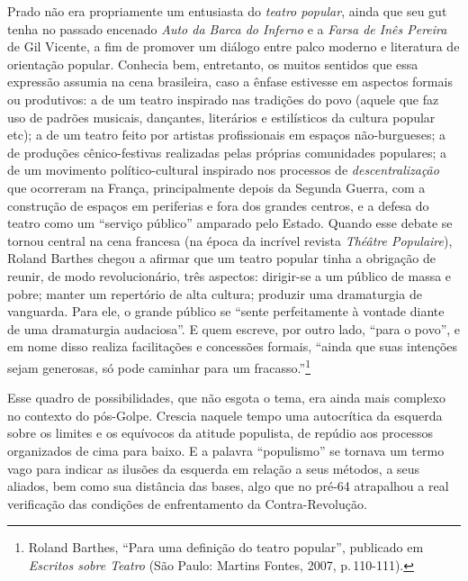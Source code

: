 Prado não era propriamente um entusiasta do {\it teatro popular}, ainda
que seu {\sc gut} tenha no passado encenado {\it Auto da Barca do Inferno} e a
{\it Farsa de Inês Pereira} de Gil Vicente, a fim de promover um diálogo
entre palco moderno e literatura de orientação popular. Conhecia bem,
entretanto, os muitos sentidos que essa expressão assumia na cena
brasileira, caso a ênfase estivesse em aspectos formais ou produtivos: a
de um teatro inspirado nas tradições do povo (aquele que faz uso de
padrões musicais, dançantes, literários e estilísticos da cultura
popular etc); a de um teatro feito por artistas profissionais em espaços
não-burgueses; a de produções cênico-festivas realizadas pelas próprias
comunidades populares; a de um movimento político-cultural inspirado nos
processos de {\it descentralização} que ocorreram na França,
principalmente depois da Segunda Guerra, com a construção de espaços em
periferias e fora dos grandes centros, e a defesa do teatro como um
“serviço público” amparado pelo Estado. Quando esse debate se tornou
central na cena francesa (na época da incrível revista {\it Théâtre
Populaire}), Roland Barthes chegou a afirmar que um teatro popular tinha
a obrigação de reunir, de modo revolucionário, três aspectos: dirigir-se
a um público de massa e pobre; manter um repertório de alta cultura;
produzir uma dramaturgia de vanguarda. Para ele, o grande público se
“sente perfeitamente à vontade diante de uma dramaturgia audaciosa”. E
quem escreve, por outro lado, “para o povo”, e em nome disso realiza
facilitações e concessões formais, “ainda que suas intenções sejam
generosas, só pode caminhar para um fracasso.”\footnote{Roland Barthes,
  “Para uma definição do teatro popular”, publicado em {\it Escritos
  sobre Teatro} (São Paulo: Martins Fontes, 2007, p.\,110-111).}

Esse quadro de possibilidades, que não esgota o tema, era ainda mais
complexo no contexto do pós-Golpe. Crescia naquele tempo uma autocrítica
da esquerda sobre os limites e os equívocos da atitude populista, de
repúdio aos processos organizados de cima para baixo. E a palavra
“populismo” se tornava um termo vago para indicar as ilusões da esquerda
em relação a seus métodos, a seus aliados, bem como sua distância das
bases, algo que no pré-64 atrapalhou a real verificação das condições de
enfrentamento da Contra-Revolução.

